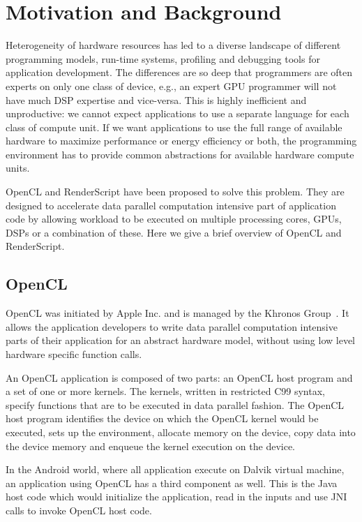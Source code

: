 \section{Motivation and Background}


Heterogeneity of hardware resources has led to a diverse landscape
of different programming models, run-time systems, profiling and debugging tools
for application development. The differences are so deep that programmers are
often experts on only one class of device, e.g., an expert GPU programmer will
not have much DSP expertise and vice-versa. This is highly inefficient and
unproductive: we cannot expect applications to use a separate language for each
class of compute unit. If we want applications to use the full range of
available hardware to maximize performance or energy efficiency or both, the
programming environment has to provide common abstractions for available
hardware compute units.

OpenCL and RenderScript have been proposed to solve this problem. They are
designed to accelerate data parallel computation intensive part of application
code by allowing workload to be executed on multiple processing cores, GPUs,
DSPs or a combination of these. Here we give a brief overview of OpenCL and
RenderScript.

\subsection{OpenCL}
OpenCL was initiated by Apple Inc. and is managed by the Khronos
Group~\cite{Khronos:url}. It allows the application developers to write
data parallel computation intensive parts of their application for an abstract
hardware model, without using low level hardware specific function calls.

An OpenCL application is composed of two parts: an OpenCL host program and a
set of one or more kernels. The kernels, written in restricted C99 syntax,
specify functions that are to be executed in data parallel fashion. The OpenCL
host program identifies the device on which the OpenCL kernel would be
executed, sets up the environment, allocate memory on the device, copy data
into the device memory and enqueue the kernel execution on the device.

In the Android world, where all application execute on Dalvik virtual machine,
an application using OpenCL has a third component as well. This is the Java
host code which would initialize the application, read in the inputs and use
JNI calls to invoke OpenCL host code.

